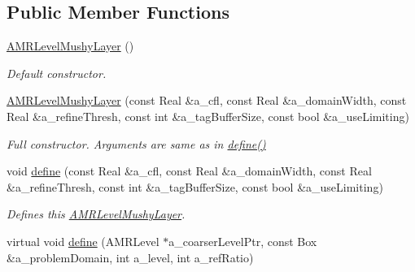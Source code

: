 \subsection*{Public Member Functions}
\begin{DoxyCompactItemize}
\item 
\hypertarget{class_a_m_r_level_mushy_layer_adfca912f4bbd65b9d39f205a57bc651d}{\hyperlink{class_a_m_r_level_mushy_layer_adfca912f4bbd65b9d39f205a57bc651d}{A\-M\-R\-Level\-Mushy\-Layer} ()}\label{class_a_m_r_level_mushy_layer_adfca912f4bbd65b9d39f205a57bc651d}

\begin{DoxyCompactList}\small\item\em Default constructor. \end{DoxyCompactList}\item 
\hypertarget{class_a_m_r_level_mushy_layer_ad86102015982967da21a13e87f13e065}{\hyperlink{class_a_m_r_level_mushy_layer_ad86102015982967da21a13e87f13e065}{A\-M\-R\-Level\-Mushy\-Layer} (const Real \&a\-\_\-cfl, const Real \&a\-\_\-domain\-Width, const Real \&a\-\_\-refine\-Thresh, const int \&a\-\_\-tag\-Buffer\-Size, const bool \&a\-\_\-use\-Limiting)}\label{class_a_m_r_level_mushy_layer_ad86102015982967da21a13e87f13e065}

\begin{DoxyCompactList}\small\item\em Full constructor. Arguments are same as in \hyperlink{class_a_m_r_level_mushy_layer_a1510d27c94955086af90d133d3932610}{define()} \end{DoxyCompactList}\item 
void \hyperlink{class_a_m_r_level_mushy_layer_a1510d27c94955086af90d133d3932610}{define} (const Real \&a\-\_\-cfl, const Real \&a\-\_\-domain\-Width, const Real \&a\-\_\-refine\-Thresh, const int \&a\-\_\-tag\-Buffer\-Size, const bool \&a\-\_\-use\-Limiting)
\begin{DoxyCompactList}\small\item\em Defines this \hyperlink{class_a_m_r_level_mushy_layer}{A\-M\-R\-Level\-Mushy\-Layer}. \end{DoxyCompactList}\item 
\hypertarget{class_a_m_r_level_mushy_layer_a4520425f77deb76db6fd3eb789e4c68b}{virtual void \hyperlink{class_a_m_r_level_mushy_layer_a4520425f77deb76db6fd3eb789e4c68b}{define} (A\-M\-R\-Level $\ast$a\-\_\-coarser\-Level\-Ptr, const Box \&a\-\_\-problem\-Domain, int a\-\_\-level, int a\-\_\-ref\-Ratio)}\label{class_a_m_r_level_mushy_layer_a4520425f77deb76db6fd3eb789e4c68b}


\end{DoxyCompactItemize}
